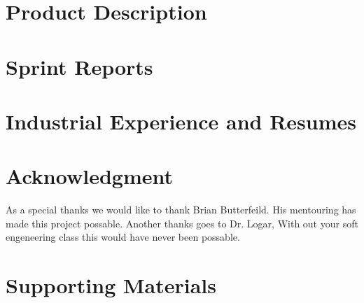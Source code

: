 \documentclass{book}
\begin{document}
\appendix

\chapter{Product Description}


%

\chapter{Sprint Reports}


\chapter{Industrial Experience and Resumes}


\chapter{Acknowledgment}
\label{SpecialThanks}  
As a special thanks we would like to thank Brian Butterfeild. His mentouring has made this project possable. \newline
Another thanks goes to Dr. Logar, With out your soft engeneering class this would have never been possable.

\chapter{Supporting Materials}


\backmatter

%

%
\end{document}

